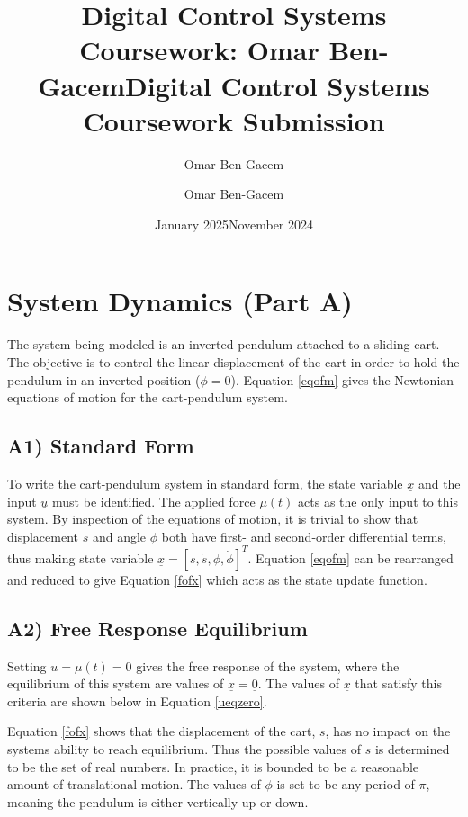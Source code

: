\documentclass{article}
\title{Digital Control Systems Coursework: Omar Ben-Gacem}
\author{Omar Ben-Gacem}
\date{January 2025}
\title{Digital Control Systems Coursework Submission}
\author{Omar Ben-Gacem}
\date{November 2024}
\begin{document}
% 


\section{System Dynamics (Part A)}
The system being modeled is an inverted pendulum attached to a sliding cart. The objective is to control the linear displacement of the cart in order to hold the pendulum in an inverted position ($\phi=0$). Equation \ref{eqofm} gives the Newtonian equations of motion for the cart-pendulum system.



\subsection*{A1) Standard Form}
To write the cart-pendulum system in standard form, the state variable $\underline{x}$ and the input $\underline{u}$ must be identified. The applied force $\mu(t)$ acts as the only input to this system. By inspection of the equations of motion, it is trivial to show that displacement $s$ and angle $\phi$ both have first- and second-order differential terms, thus making state variable $\underline{x} = [s, \dot s, \phi, \dot\phi]^T$. Equation \ref{eqofm} can be rearranged and reduced to give Equation \ref{fofx} which acts as the state update function.



\subsection*{A2) Free Response Equilibrium}
Setting $u=\mu(t)=0$ gives the free response of the system, where the equilibrium of this system are values of $\underline{\dot x}=\underline{0}$. The values of $\underline{x}$ that satisfy this criteria are shown below in Equation \ref{ueqzero}.



Equation \ref{fofx} shows that the displacement of the cart, $s$, has no impact on the systems ability to reach equilibrium. Thus the possible values of $s$ is determined to be the set of real numbers. In practice, it is bounded to be a reasonable amount of translational motion. The values of $\phi$ is set to be any period of $\pi$, meaning the pendulum is either vertically up or down. 
\end{document}
